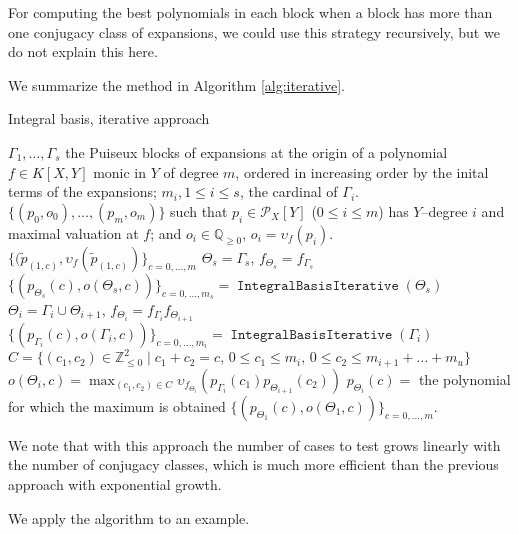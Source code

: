 \documentclass[a4paper,11pt]{amsart}%
\theoremstyle{definition}
\theoremstyle{plain}
\theoremstyle{remark}
\DeclareMathOperator{\IntegralBasisIterative}{\mathtt{IntegralBasisIterative}}
\newcommand{\Q}{{\mathbb Q}}
\newcommand{\Z}{{\mathbb Z}}
\begin{document}
For computing the best polynomials in each block when a block has more than one conjugacy class of expansions, we could use this strategy
recursively, but we do not explain this here.

We summarize the method in Algorithm \ref{alg:iterative}.

\begin{algorithm}[H]                      %
\caption{Integral basis, iterative approach}          %
\label{alg:iterative}
\begin{algorithmic}[1]
\REQUIRE $\Gamma_1, \dots, \Gamma_s$ the Puiseux blocks of expansions at the origin of a polynomial $f \in K[X,Y]$ monic in $Y$ of degree $m$, ordered in increasing order by the inital terms of the expansions; $m_i, 1 \le i \le s$, the cardinal of $\Gamma_i$.
\ENSURE $\{(p_0, o_0), \dots, (p_{m}, o_{m})\}$ such that $p_i \in {\mathcal{P}_{X}}[Y]$ ($0 \leq i \leq m$) has $Y$--degree $i$ and
maximal valuation at $f$; and $o_i \in \Q_{\geq 0}$, $o_i = \upsilon_f(p_i) $.
\RETURN $\{(\tilde p_{(1, c)}, \upsilon_{f}(\tilde p_{(1, c)})\}_{c= 0, \dots, m}$
\ELSE
\STATE $\Theta_s = \Gamma_s$, $f_{\Theta_s} = f_{\Gamma_s}$
\STATE $\{(p_{\Theta_s}(c), o(\Theta_s, c))\}_{c = 0, \dots, m_s} = \IntegralBasisIterative(\Theta_s)$
\STATE $\Theta_i = \Gamma_i \cup \Theta_{i+1}$, $f_{\Theta_i} = f_{\Gamma_i} f_{\Theta_{i+1}}$
\STATE $\{(p_{\Gamma_i}(c), o(\Gamma_i, c))\}_{c = 0, \dots, m_i} = \IntegralBasisIterative(\Gamma_i)$
\STATE $C = \{(c_1, c_2) \in \Z_{\leq 0}^2 \mid c_1 + c_2 = c\mbox{, }0 \leq c_1 \leq m_i\mbox{, }0 \leq c_2 \leq m_{i+1} + \dots + m_u\}$
\STATE $o(\Theta_{i}, c) = \max_{(c_1, c_2) \in C} \upsilon_{f_{\Theta_{i}}%
}(p_{\Gamma_{i}}(c_{1})p_{\Theta_{i+1}}(c_{2}))$
\STATE $p_{\Theta_i}(c) = $ the polynomial for which the maximum is obtained
\ENDFOR
\ENDFOR
\RETURN $\{(p_{\Theta_1}(c), o(\Theta_1, c))\}_{c = 0, \dots, m}$.
\ENDIF
\end{algorithmic}
\end{algorithm}

We note that with this approach the number of cases to test grows linearly with the number of conjugacy classes, which is much more efficient than the previous approach with exponential growth.

We apply the algorithm to an example.
\end{document}
